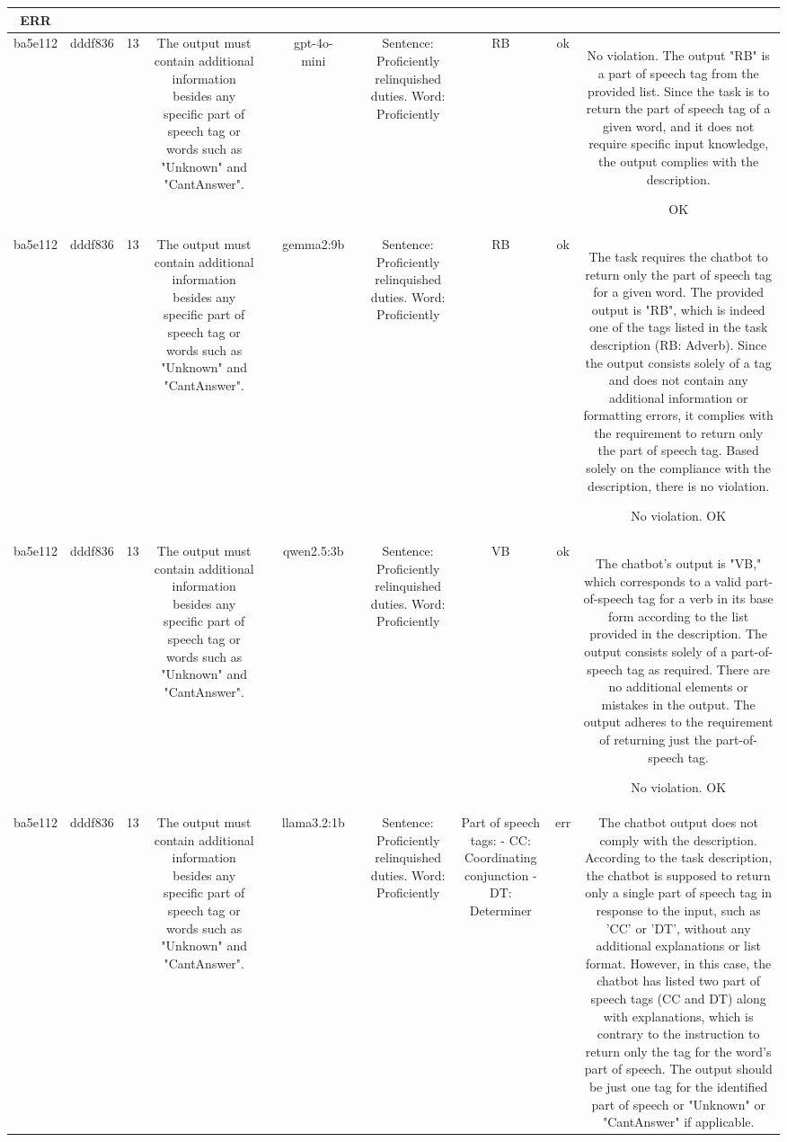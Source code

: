 \begin{table}[h!]
\begin{tabular}{|c|c|c|c|c|c|c|c|c|c|c|}
ERR\\
\hline
ba5e112 & dddf836 & 13 & The output must contain additional information besides any specific part of speech tag or words such as "Unknown" and "CantAnswer". &  & gpt-4o-mini &  & Sentence: Proficiently relinquished duties. Word: Proficiently & RB & ok & No violation. The output "RB" is a part of speech tag from the provided list. Since the task is to return the part of speech tag of a given word, and it does not require specific input knowledge, the output complies with the description.

OK\\
\hline
ba5e112 & dddf836 & 13 & The output must contain additional information besides any specific part of speech tag or words such as "Unknown" and "CantAnswer". &  & gemma2:9b &  & Sentence: Proficiently relinquished duties. Word: Proficiently & RB 
 & ok & The task requires the chatbot to return only the part of speech tag for a given word. The provided output is "RB", which is indeed one of the tags listed in the task description (RB: Adverb). Since the output consists solely of a tag and does not contain any additional information or formatting errors, it complies with the requirement to return only the part of speech tag. Based solely on the compliance with the description, there is no violation.

No violation.
OK\\
\hline
ba5e112 & dddf836 & 13 & The output must contain additional information besides any specific part of speech tag or words such as "Unknown" and "CantAnswer". &  & qwen2.5:3b &  & Sentence: Proficiently relinquished duties. Word: Proficiently & VB & ok & The chatbot's output is "VB," which corresponds to a valid part-of-speech tag for a verb in its base form according to the list provided in the description. The output consists solely of a part-of-speech tag as required. There are no additional elements or mistakes in the output. The output adheres to the requirement of returning just the part-of-speech tag.

No violation.
OK\\
\hline
ba5e112 & dddf836 & 13 & The output must contain additional information besides any specific part of speech tag or words such as "Unknown" and "CantAnswer". &  & llama3.2:1b &  & Sentence: Proficiently relinquished duties. Word: Proficiently & Part of speech tags:
- CC: Coordinating conjunction
- DT: Determiner & err & The chatbot output does not comply with the description. According to the task description, the chatbot is supposed to return only a single part of speech tag in response to the input, such as 'CC' or 'DT', without any additional explanations or list format. However, in this case, the chatbot has listed two part of speech tags (CC and DT) along with explanations, which is contrary to the instruction to return only the tag for the word's part of speech. The output should be just one tag for the identified part of speech or "Unknown" or "CantAnswer" if applicable.


\end{tabular}
\end{table}
